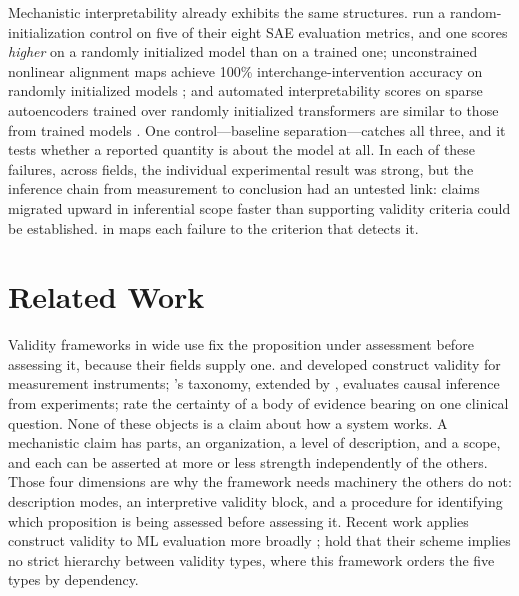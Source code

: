 \documentclass{article}
\begin{document}
Mechanistic interpretability already exhibits the same structures. \citet{karvonen2025saebench} run a random-initialization control on five of their eight SAE evaluation metrics, and one scores \emph{higher} on a randomly initialized model than on a trained one; unconstrained nonlinear alignment maps achieve 100\% interchange-intervention accuracy on randomly initialized models \citep{sutter2025nonlinear}; and automated interpretability scores on sparse autoencoders trained over randomly initialized transformers are similar to those from trained models \citep{heap2025sparse}. One control---baseline separation---catches all three, and it tests whether a reported quantity is about the model at all. In each of these failures, across fields, the individual experimental result was strong, but the inference chain from measurement to conclusion had an untested link: claims migrated upward in inferential scope faster than supporting validity criteria could be established.  in  maps each failure to the criterion that detects it.

\section{Related Work}
\label{sec:related}

Validity frameworks in wide use fix the proposition under assessment before assessing it, because their fields supply one. \citet{cronbach1955construct} and \citet{messick1995validity} developed construct validity for measurement instruments; \citeauthor{campbell1963experimental}'s taxonomy, extended by \citet{shadish2002experimental}, evaluates causal inference from experiments; \citet{guyatt2008grade} rate the certainty of a body of evidence bearing on one clinical question. None of these objects is a claim about how a system works. A mechanistic claim has parts, an organization, a level of description, and a scope, and each can be asserted at more or less strength independently of the others. Those four dimensions are why the framework needs machinery the others do not: description modes, an interpretive validity block, and a procedure for identifying which proposition is being assessed before assessing it. Recent work applies construct validity to ML evaluation more broadly \citep{bean2025measuring, freiesleben2025benchmarking}; \citeauthor{freiesleben2025benchmarking} hold that their scheme implies no strict hierarchy between validity types, where this framework orders the five types by dependency.
\end{document}
